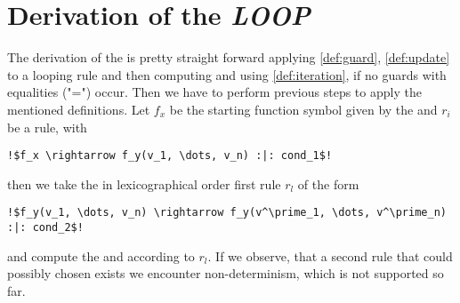 \section{Derivation of the \emph{LOOP}}
\label{sec:loop}
The derivation of the \loopt is pretty straight forward applying \autoref{def:guard}, \autoref{def:update} to a looping rule and then computing \iterationmatrix and \iterationconstants using \autoref{def:iteration}, if no guards with equalities ("=") occur. Then we have to perform previous steps to apply the mentioned definitions. \newline
Let $f_x$ be the starting function symbol given by the \its and $r_i$ be a rule, with 
\begin{lstlisting}[escapechar=!]
	!$f_x \rightarrow f_y(v_1, \dots, v_n) :|: cond_1$!
\end{lstlisting} 
then we take the in lexicographical order first rule $r_l$ of the form 
\begin{lstlisting}[escapechar=!]
	!$f_y(v_1, \dots, v_n) \rightarrow f_y(v^\prime_1, \dots, v^\prime_n) :|: cond_2$!
\end{lstlisting}
and compute the \iterationmatrix and \iterationconstants according to $r_l$. If we observe, that a second rule that could possibly chosen exists we encounter non-determinism, which is not supported so far.

